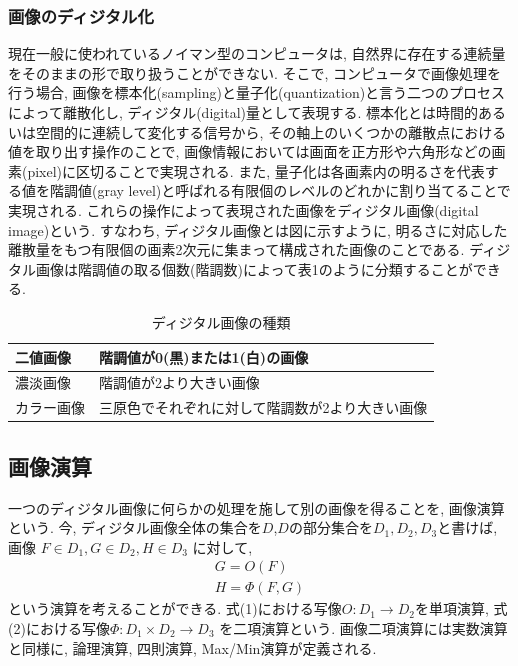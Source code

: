 \documentclass[a4paper,11pt,uplatex, titlepage]{jsarticle}
\begin{document}
\subsubsection{画像のディジタル化}
現在一般に使われているノイマン型のコンピュータは, 自然界に存在する連続量をそのままの形で取り扱うことができない.
そこで, コンピュータで画像処理を行う場合, 画像を標本化(sampling)と量子化(quantization)と言う二つのプロセスによって離散化し,
ディジタル(digital)量として表現する. 標本化とは時間的あるいは空間的に連続して変化する信号から,
その軸上のいくつかの離散点における値を取り出す操作のことで, 画像情報においては画面を正方形や六角形などの画素(pixel)に区切ることで実現される.
また, 量子化は各画素内の明るさを代表する値を階調値(gray level)と呼ばれる有限個のレベルのどれかに割り当てることで実現される.
これらの操作によって表現された画像をディジタル画像(digital image)という. すなわち, ディジタル画像とは図に示すように,
明るさに対応した離散量をもつ有限個の画素2次元に集まって構成された画像のことである.
ディジタル画像は階調値の取る個数(階調数)によって表1のように分類することができる.

\begin{table}[H]
  \begin{center}
    \caption{ディジタル画像の種類}
    \begin{tabular}{|l|l|}
    \hline
    二値画像 & 階調値が0(黒)または1(白)の画像 \\ \hline
    濃淡画像 & 階調値が2より大きい画像  \\ \hline
    カラー画像 & 三原色でそれぞれに対して階調数が2より大きい画像 \\ \hline
    \end{tabular}
  \end{center}
\end{table}

\subsection{画像演算}
一つのディジタル画像に何らかの処理を施して別の画像を得ることを, 画像演算という.
今, ディジタル画像全体の集合を$D$,$D$の部分集合を$D_1,D_2,D_3$と書けば, 画像 $F \in D_1, G \in D_2, H \in D_3$
に対して,
\begin{align}
  G = O(F) \\
  H = \Phi(F,G)
\end{align}
という演算を考えることができる. 式(1)における写像$O: D_1 \to D_2$を単項演算, 式(2)における写像$\Phi: D_1 \times D_2 \to D_3$
を二項演算という. 画像二項演算には実数演算と同様に, 論理演算, 四則演算, Max/Min演算が定義される.
\end{document}
